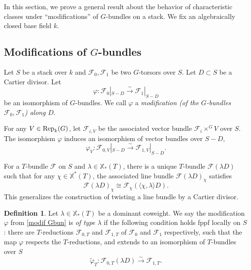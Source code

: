 \documentclass[reqno]{amsart}
\numberwithin{equation}{subsection}
\theoremstyle{definition}
\newtheorem{defn}[subsubsection]{Definition}
\newcommand{\TF}[1]{{\color{ForestGreen}{#1}}}
\newcommand\cF{\mathcal{F}}
\newcommand\Rep{\textup{Rep}}
\newcommand\xch{\mathbb{X}^*}
\newcommand\xcoch{\mathbb{X}_*}
\renewcommand{\j}[1]{\langle{#1}\rangle}
\newcommand{\wt}[1]{\widetilde{#1}}
\newcommand{\isom}{\stackrel{\sim}{\to}}
\newcommand{\ph}{\varphi}
\renewcommand{\l}{\lambda}
\newcommand\Yun[1]{{\color{red} Y:#1}}
\newcommand\mnote[1]{\marginpar{\tiny #1}}
\begin{document}
In this section, we prove a general result about the behavior of characteristic classes under ``modifications'' of $G$-bundles on a stack. We fix an algebraically closed base field $k$. 




\subsection{Modifications of $G$-bundles}\label{sss:setup mod along div} 
Let $S$ be a stack over $k$ and $\cF_{0}, \cF_{1}$ be two  $G$-torsors over $S$. Let $D\subset S$ be a Cartier divisor. Let 
\begin{equation}\label{modif Gbun}
\ph: \cF_{0}|_{S-D}\isom \cF_{1}|_{S-D}
\end{equation}
be an isomorphism of $G$-bundles. We call $\ph$ a \emph{modification (of the $G$-bundles $\cF_0, \cF_1$) along $D$}. 

For any $V\in\Rep_k(G)$, let $\cF_{i,V}$ be the associated vector bundle $\cF_{i}\times^{G}V$ over $S$. The isomorphism $\ph$ induces an isomorphism  of vector bundles over $S-D$,
\begin{equation*}
\ph_{V}: \cF_{0,V}|_{S-D}\isom \cF_{1,V}|_{S-D}.
\end{equation*}

 
For a $T$-bundle $\cF$ on $S$ and $\l\in \xcoch(T)$, there is a unique $T$-bundle $\cF(\l D)$ such that for any $\chi\in \xch(T)$, the associated line bundle $\cF(\l D)_{\chi}$ satisfies 
\[
\cF(\l D)_{\chi}  \cong \cF_{\chi}(\j{\chi,\l}D).
\]
This generalizes the construction of twisting a line bundle by a Cartier divisor. 

\begin{defn}\label{defn: modification} Let $\l\in \xcoch(T)$ be a dominant coweight. We say the modification $\ph$ from \eqref{modif Gbun} is {\em of type $\l$} if the following condition holds fppf locally on $S$: there are $T$-reductions $\cF_{0,T}$ and $\cF_{1,T}$ of $\cF_{0}$ and $\cF_{1}$ respectively, such that the map $\ph$ respects the $T$-reductions, and extends to an isomorphism of $T$-bundles over $S$
\begin{equation}\label{phT ext}
\wt \ph_{T}: \cF_{0,T}(\l D)\isom \cF_{1,T}.
\end{equation}
\end{defn}
\end{document}
